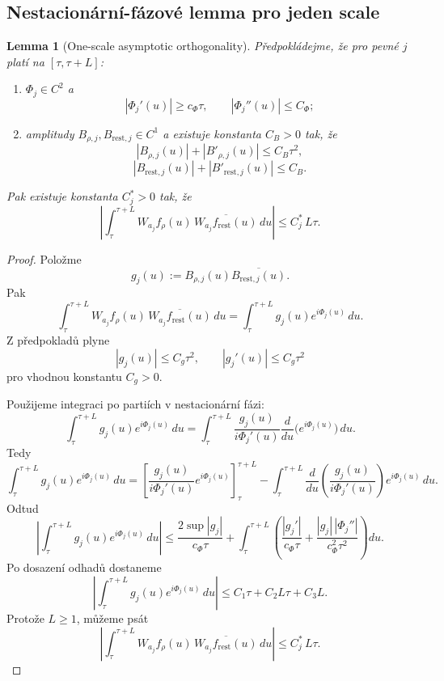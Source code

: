 \documentclass[11pt,a4paper]{article}
\newtheorem{lemma}[theorem]{Lemma}
\begin{document}
\subsection*{Nestacionární-fázové lemma pro jeden scale}

\begin{lemma}[One-scale asymptotic orthogonality]
Předpokládejme, že pro pevné \(j\) platí na \([\tau,\tau+L]\):
\begin{enumerate}[label=\textbf{(\arabic*)}]
    \item \(\Phi_j\in C^2\) a
    \[
    |\Phi_j'(u)|\ge c_\Phi\tau,
    \qquad
    |\Phi_j''(u)|\le C_\Phi;
    \]
    \item amplitudy \(B_{\rho,j},B_{\mathrm{rest},j}\in C^1\) a existuje konstanta \(C_B>0\) tak, že
    \[
    |B_{\rho,j}(u)|+|B'_{\rho,j}(u)|\le C_B\tau^2,
    \]
    \[
    |B_{\mathrm{rest},j}(u)|+|B'_{\mathrm{rest},j}(u)|\le C_B.
    \]
\end{enumerate}
Pak existuje konstanta \(C_j^*>0\) tak, že
\[
\left|
\int_\tau^{\tau+L}
W_{a_j}f_\rho(u)\,\overline{W_{a_j}f_{\mathrm{rest}}(u)}\,du
\right|
\le
C_j^*\,L\tau.
\]
\end{lemma}

\begin{proof}
Položme
\[
g_j(u):=B_{\rho,j}(u)\overline{B_{\mathrm{rest},j}(u)}.
\]
Pak
\[
\int_\tau^{\tau+L}
W_{a_j}f_\rho(u)\,\overline{W_{a_j}f_{\mathrm{rest}}(u)}\,du
=
\int_\tau^{\tau+L} g_j(u)e^{i\Phi_j(u)}\,du.
\]
Z předpokladů plyne
\[
|g_j(u)|\le C_g\tau^2,
\qquad
|g_j'(u)|\le C_g\tau^2
\]
pro vhodnou konstantu \(C_g>0\).

Použijeme integraci po partiích v nestacionární fázi:
\[
\int_\tau^{\tau+L} g_j(u)e^{i\Phi_j(u)}\,du
=
\int_\tau^{\tau+L}
\frac{g_j(u)}{i\Phi_j'(u)}
\frac{d}{du}\bigl(e^{i\Phi_j(u)}\bigr)\,du.
\]
Tedy
\[
\int_\tau^{\tau+L} g_j(u)e^{i\Phi_j(u)}\,du
=
\left[
\frac{g_j(u)}{i\Phi_j'(u)}e^{i\Phi_j(u)}
\right]_{\tau}^{\tau+L}
-
\int_\tau^{\tau+L}
\frac{d}{du}\left(\frac{g_j(u)}{i\Phi_j'(u)}\right)e^{i\Phi_j(u)}\,du.
\]
Odtud
\[
\left|
\int_\tau^{\tau+L} g_j(u)e^{i\Phi_j(u)}\,du
\right|
\le
\frac{2\sup |g_j|}{c_\Phi\tau}
+
\int_\tau^{\tau+L}
\left(
\frac{|g_j'|}{c_\Phi\tau}
+
\frac{|g_j|\,|\Phi_j''|}{c_\Phi^2\tau^2}
\right)du.
\]
Po dosazení odhadů dostaneme
\[
\left|
\int_\tau^{\tau+L} g_j(u)e^{i\Phi_j(u)}\,du
\right|
\le
C_1\tau + C_2L\tau + C_3L.
\]
Protože \(L\ge 1\), můžeme psát
\[
\left|
\int_\tau^{\tau+L}
W_{a_j}f_\rho(u)\,\overline{W_{a_j}f_{\mathrm{rest}}(u)}\,du
\right|
\le
C_j^*\,L\tau.
\]
\end{proof}
\end{document}
